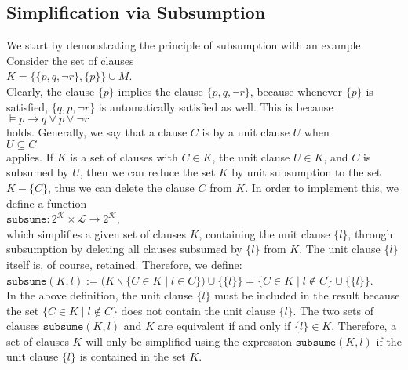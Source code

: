 \subsection{Simplification via Subsumption}
We start by demonstrating the principle of subsumption with an example.
Consider the set of clauses
\\[0.2cm]
\hspace*{1.3cm} $K = \bigl\{ \{p, q, \neg r\}, \{p\} \bigr\} \cup M$. \\[0.2cm]
Clearly, the clause $\{p\}$ implies the clause $\{p, q, \neg r\}$, because whenever
$\{p\}$ is satisfied, $\{q, p, \neg r\}$ is automatically satisfied as well. This is because
\\[0.2cm]
\hspace*{1.3cm} $\models p \rightarrow q \vee p \vee \neg r$
\\[0.2cm]
holds. Generally, we say that a clause $C$
is  by a unit clause $U$ when
\\[0.2cm]
\hspace*{1.3cm} $U \subseteq C$ \\[0.2cm]
applies. If $K$ is a set of clauses with $C \in K$, the unit clause $U \in K$, and
$C$ is subsumed by $U$, then we can reduce the set $K$ by unit subsumption to the set $K - \{ C \}$,
thus we can delete the clause $C$ from $K$.  In order to implement this, we define a function
\\[0.2cm]
\hspace*{1.3cm}
$\texttt{subsume}: 2^\mathcal{K} \times \mathcal{L} \rightarrow 2^\mathcal{K}$,
\\[0.2cm]
which simplifies a given set of clauses $K$, containing the unit clause $\{l\}$, through subsumption
by deleting all clauses subsumed by $\{l\}$ from $K$.
The unit clause $\{l\}$ itself is, of course, retained. Therefore, we define:
\\[0.2cm]
\hspace*{1.3cm}
$\texttt{subsume}(K, l) := 
\bigl(K \backslash \bigl\{ C \in K \mid l \in C \bigr\}\bigr) \cup \bigl\{\{l\}\bigr\} = 
\bigl\{ C \in K \mid l \not\in C \bigr\} \cup \bigl\{\{l\}\bigr\}$.
\\[0.2cm]
In the above definition, the unit clause $\{l\}$ must be included in the result because the set
\mbox{$\bigl\{ C \in K \mid l \not\in C \bigr\}$} does not contain the unit clause $\{l\}$. The two sets of clauses
$\mathtt{subsume}(K,l)$ and $K$ are equivalent if and only if $\{l\} \in K$.
Therefore, a set of clauses $K$ will only be simplified using the expression $\texttt{subsume}(K, l)$ if
the unit clause $\{l\}$ is contained in the set $K$.

